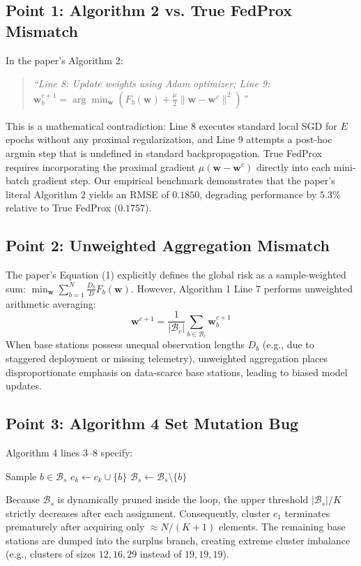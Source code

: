 \documentclass[10pt,journal,compsoc,twocolumn]{article}
\begin{document}
\subsection{Point 1: Algorithm 2 vs. True FedProx Mismatch}
In the paper's Algorithm 2:
\begin{quote}
\textit{``Line 8: Update weights using Adam optimizer; Line 9: $\mathbf{w}_b^{c+1} = \arg\min_{\mathbf{w}} (F_b(\mathbf{w}) + \frac{\mu}{2}\|\mathbf{w} - \mathbf{w}^c\|^2)$''}
\end{quote}
This is a mathematical contradiction: Line 8 executes standard local SGD for $E$ epochs without any proximal regularization, and Line 9 attempts a post-hoc argmin step that is undefined in standard backpropagation. True FedProx requires incorporating the proximal gradient $\mu(\mathbf{w} - \mathbf{w}^c)$ directly into each mini-batch gradient step. Our empirical benchmark demonstrates that the paper's literal Algorithm 2 yields an RMSE of $0.1850$, degrading performance by $5.3\%$ relative to True FedProx ($0.1757$).

\subsection{Point 2: Unweighted Aggregation Mismatch}
The paper's Equation (1) explicitly defines the global risk as a sample-weighted sum: $\min_{\mathbf{w}} \sum_{b=1}^N \frac{D_b}{D} F_b(\mathbf{w})$. However, Algorithm 1 Line 7 performs unweighted arithmetic averaging:
\begin{equation}
    \mathbf{w}^{c+1} = \frac{1}{|\mathcal{B}_c|} \sum_{b \in \mathcal{B}_c} \mathbf{w}_b^{c+1}
\end{equation}
When base stations possess unequal observation lengths $D_b$ (e.g., due to staggered deployment or missing telemetry), unweighted aggregation places disproportionate emphasis on data-scarce base stations, leading to biased model updates.

\subsection{Point 3: Algorithm 4 Set Mutation Bug}
Algorithm 4 lines 3--8 specify:
\begin{algorithmic}[1]
    \State Sample $b \in \mathcal{B}_s$
    \State $c_k \leftarrow c_k \cup \{b\}$
    \State $\mathcal{B}_s \leftarrow \mathcal{B}_s \setminus \{b\}$
\EndWhile
\end{algorithmic}
Because $\mathcal{B}_s$ is dynamically pruned inside the loop, the upper threshold $|\mathcal{B}_s| / K$ strictly decreases after each assignment. Consequently, cluster $c_1$ terminates prematurely after acquiring only $\approx N / (K+1)$ elements. The remaining base stations are dumped into the surplus branch, creating extreme cluster imbalance (e.g., clusters of sizes $12, 16, 29$ instead of $19, 19, 19$).
\end{document}
